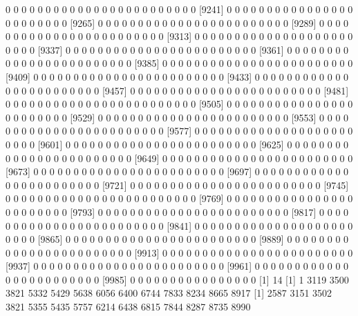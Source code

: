 \documentclass[11pt]{article}
\begin{document}
\begin{Schunk}
\begin{Soutput}
 [9217]  0  0  0  0  0  0  0  0  0  0  0  0  0  0  0  0  0  0  0  0  0  0  0  0
 [9241]  0  0  0  0  0  0  0  0  0  0  0  0  0  0  0  0  0  0  0  0  0  0  0  0
 [9265]  0  0  0  0  0  0  0  0  0  0  0  0  0  0  0  0  0  0  0  0  0  0  0  0
 [9289]  0  0  0  0  0  0  0  0  0  0  0  0  0  0  0  0  0  0  0  0  0  0  0  0
 [9313]  0  0  0  0  0  0  0  0  0  0  0  0  0  0  0  0  0  0  0  0  0  0  0  0
 [9337]  0  0  0  0  0  0  0  0  0  0  0  0  0  0  0  0  0  0  0  0  0  0  0  0
 [9361]  0  0  0  0  0  0  0  0  0  0  0  0  0  0  0  0  0  0  0  0  0  0  0  0
 [9385]  0  0  0  0  0  0  0  0  0  0  0  0  0  0  0  0  0  0  0  0  0  0  0  0
 [9409]  0  0  0  0  0  0  0  0  0  0  0  0  0  0  0  0  0  0  0  0  0  0  0  0
 [9433]  0  0  0  0  0  0  0  0  0  0  0  0  0  0  0  0  0  0  0  0  0  0  0  0
 [9457]  0  0  0  0  0  0  0  0  0  0  0  0  0  0  0  0  0  0  0  0  0  0  0  0
 [9481]  0  0  0  0  0  0  0  0  0  0  0  0  0  0  0  0  0  0  0  0  0  0  0  0
 [9505]  0  0  0  0  0  0  0  0  0  0  0  0  0  0  0  0  0  0  0  0  0  0  0  0
 [9529]  0  0  0  0  0  0  0  0  0  0  0  0  0  0  0  0  0  0  0  0  0  0  0  0
 [9553]  0  0  0  0  0  0  0  0  0  0  0  0  0  0  0  0  0  0  0  0  0  0  0  0
 [9577]  0  0  0  0  0  0  0  0  0  0  0  0  0  0  0  0  0  0  0  0  0  0  0  0
 [9601]  0  0  0  0  0  0  0  0  0  0  0  0  0  0  0  0  0  0  0  0  0  0  0  0
 [9625]  0  0  0  0  0  0  0  0  0  0  0  0  0  0  0  0  0  0  0  0  0  0  0  0
 [9649]  0  0  0  0  0  0  0  0  0  0  0  0  0  0  0  0  0  0  0  0  0  0  0  0
 [9673]  0  0  0  0  0  0  0  0  0  0  0  0  0  0  0  0  0  0  0  0  0  0  0  0
 [9697]  0  0  0  0  0  0  0  0  0  0  0  0  0  0  0  0  0  0  0  0  0  0  0  0
 [9721]  0  0  0  0  0  0  0  0  0  0  0  0  0  0  0  0  0  0  0  0  0  0  0  0
 [9745]  0  0  0  0  0  0  0  0  0  0  0  0  0  0  0  0  0  0  0  0  0  0  0  0
 [9769]  0  0  0  0  0  0  0  0  0  0  0  0  0  0  0  0  0  0  0  0  0  0  0  0
 [9793]  0  0  0  0  0  0  0  0  0  0  0  0  0  0  0  0  0  0  0  0  0  0  0  0
 [9817]  0  0  0  0  0  0  0  0  0  0  0  0  0  0  0  0  0  0  0  0  0  0  0  0
 [9841]  0  0  0  0  0  0  0  0  0  0  0  0  0  0  0  0  0  0  0  0  0  0  0  0
 [9865]  0  0  0  0  0  0  0  0  0  0  0  0  0  0  0  0  0  0  0  0  0  0  0  0
 [9889]  0  0  0  0  0  0  0  0  0  0  0  0  0  0  0  0  0  0  0  0  0  0  0  0
 [9913]  0  0  0  0  0  0  0  0  0  0  0  0  0  0  0  0  0  0  0  0  0  0  0  0
 [9937]  0  0  0  0  0  0  0  0  0  0  0  0  0  0  0  0  0  0  0  0  0  0  0  0
 [9961]  0  0  0  0  0  0  0  0  0  0  0  0  0  0  0  0  0  0  0  0  0  0  0  0
 [9985]  0  0  0  0  0  0  0  0  0  0  0  0  0  0  0  0
[1] 14
 [1]    1 3119 3500 3821 5332 5429 5638 6056 6400 6744 7833 8234 8665 8917
 [1] 2587 3151 3502 3821 5355 5435 5757 6214 6438 6815 7844 8287 8735 8990
\end{Soutput}
\end{Schunk}
\end{document}
